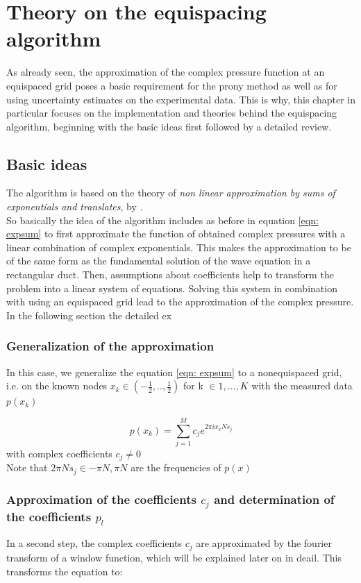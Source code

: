 \documentclass[11pt]{report} %
\begin{document}
\chapter{Theory on the equispacing algorithm} 
As already seen, the approximation of the complex pressure function at an equispaced grid poses a basic requirement for the prony method as well as for using uncertainty estimates on the experimental data.
This is why, this chapter in particular focuses on the implementation and theories behind the equispacing algorithm, beginning with the basic ideas first followed by a detailed review. 

\section{Basic ideas}
The algorithm is based on the theory of \textit{non linear approximation by sums of exponentials and translates}, by \cite{Peter2011}.\\
So basically the idea of the algorithm includes as before in equation \eqref{eqn: expsum} to first approximate the function of obtained complex pressures with a linear combination of complex exponentials.
This makes the approximation to be of the same form as the fundamental solution of the wave equation in a rectangular duct.
Then, assumptions about coefficients help to transform the problem into a linear system of equations. Solving this system in combination with using an equispaced grid lead to the approximation of the complex pressure. 
In the following section the detailed ex

\subsection{Generalization of the approximation}
In this case, we generalize the equation \eqref{eqn: expsum} to a nonequispaced grid, i.e. on the known nodes $x_{k}\in (-\frac{1}{2},..,\frac{1}{2})$ for k $\in{1,..., K}$ with the measured data  $p(x_{k}) $

\begin{equation}
 p(x_{k})=\sum\limits_{j=1}^M c_{j}e^{2\pi ix_{k}Ns_{j}}
\end{equation}
with complex coefficients $c_{j} \neq 0$
\\
Note that $2 \pi Ns_j \in{-\pi N,\pi N}$ are the frequencies of $p(x)$

\subsection{Approximation of the coefficients $c_j$ and determination of the coefficients $p_l$}
In a second step, the complex coefficients $c_j$ are approximated by the fourier transform of a window function, which will be explained later on in deail. 
This transforms the equation to: 
\end{document}
